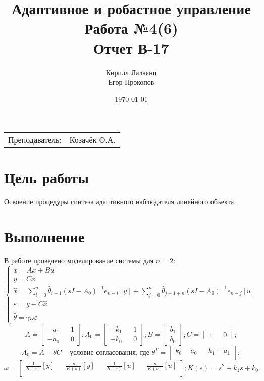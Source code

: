 \documentclass{article}
\title{Адаптивное и робастное управление \\ Работа №4(6) \\ Отчет В-17} %
\author{Кирилл Лалаянц \\ Егор Прокопов} %
\date{\today} %
\begin{document}
\maketitle %

\begin{center}
\begin{tabular}{l r}
Преподаватель: & Козачёк О.А. %
\end{tabular}
\end{center}
\newpage

\section{Цель работы}

Освоение процедуры синтеза адаптивного наблюдателя
линейного объекта.

\section{Выполнение}
В работе проведено моделирование системы для \(n = 2\):
\[
\begin{cases}
    \dot x = A x + Bu \\
    y = C x \\
    \hat x = \sum_{i=0}^{n}\hat \theta_{i+1} (sI - A_0)^{-1} e_{n-i} [y] + \sum_{j=0}^{n}\hat \theta_{j + 1 + n} (sI - A_0)^{-1} e_{n - j} [u] \\
    \varepsilon = y - C \hat x  \\ 
    \dot {\hat \theta} = \gamma \omega \varepsilon
\end{cases}
\]
\[
  A = \begin{bmatrix}
    -a_1 && 1\\
    -a_0 && 0
  \end{bmatrix};
  A_0 = \begin{bmatrix}
    -k_1 && 1\\
    -k_0 && 0
  \end{bmatrix};
  B = \begin{bmatrix}
    b_1 \\
    b_0
  \end{bmatrix};
  C = \begin{bmatrix}
    1 && 0
  \end{bmatrix};
\]
\[
A_0 = A - \theta C \text{ -- условие согласования, где } 
\theta ^ T= \begin{bmatrix}
  k_0 - a_0 && k_1 - a_1\\
\end{bmatrix};
\]
\[
  \omega = \begin{bmatrix}
    \frac{1}{K(s)}[y] && \frac{s}{K(s)}[y] && \frac{1}{K(s)}[u] && \frac{s}{K(s)}[u]\\
  \end{bmatrix};
K(s) = s^2 + k_1 s + k_0 .\]
\end{document}
